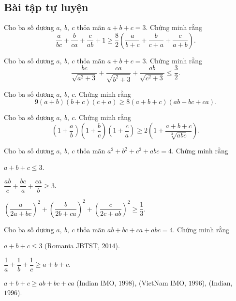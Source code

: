 {\subsection{Bài tập tự luyện}
\setcounter{bt}{0}
\begin{bt}%
	Cho ba số dương $ a,\ b,\ c $ thỏa mãn $ a+b+c=3 $. Chứng minh rằng
	\[ 
	\dfrac{a}{bc}+\dfrac{b}{ca}+\dfrac{c}{ab}+1\geq \dfrac{8}{2}\left(\dfrac{a}{b+c}+\dfrac{b}{c+a}+\dfrac{c}{a+b}\right).
	\]
\end{bt}
\begin{bt}%
	Cho ba số dương $ a,\ b,\ c $ thỏa mãn $ a+b+c=3 $. Chứng minh rằng
	\[ 
	\dfrac{bc}{\sqrt{a^{2}+3}}+\dfrac{ca}{\sqrt{b^{2}+3}}+\dfrac{ab}{\sqrt{c^{2}+3}}\leq \dfrac{3}{2}.
	\]
\end{bt}
\begin{bt}%
	Cho ba số dương $ a,\ b,\ c $. Chứng minh rằng
	\[ 
	9(a+b)(b+c)(c+a)\geq 8(a+b+c)(ab+bc+ca).
	\]
\end{bt}
\begin{bt}%
	Cho ba số dương $ a,\ b,\ c $. Chứng minh rằng
	\[ 
	\left(1+\dfrac{a}{b}\right)\left(1+\dfrac{b}{c}\right)\left(1+\dfrac{c}{a}\right)\geq 2\left(1+\dfrac{a+b+c}{\sqrt[3]{abc}}\right).
	\]
\end{bt}
\begin{bt}%
	Cho ba số dương $ a,\ b,\ c $ thỏa mãn $ a^{2}+b^{2}+c^{2}+abc=4 $. Chứng minh rằng
	\begin{enumEX}{2}
		\item $ a+b+c\leq 3 $.
		\item $ \dfrac{ab}{c}+\dfrac{bc}{a}+\dfrac{ca}{b}\geq 3 $.
		\item $ \left(\dfrac{a}{2a+bc}\right)^{2}+\left(\dfrac{b}{2b+ca}\right)^{2}+\left(\dfrac{c}{2c+ab}\right)^{2}\geq \dfrac{1}{3} $.
	\end{enumEX}
\end{bt}
\begin{bt}%
	Cho ba số dương $ a,\ b,\ c $ thỏa mãn $ ab+bc+ca+abc=4 $. Chứng minh rằng
	\begin{enumEX}{1}
		\item $ a+b+c\leq 3 $ (Romania JBTST, $ 2014 $).
		\item $ \dfrac{1}{a}+\dfrac{1}{b}+\dfrac{1}{c}\geq a+b+c $.
		\item $ a+b+c\geq ab+bc+ca $ (Indian IMO, $ 1998 $), (VietNam IMO, $ 1996 $), (Indian, $ 1996 $).

\end{enumEX}
\end{bt}}
